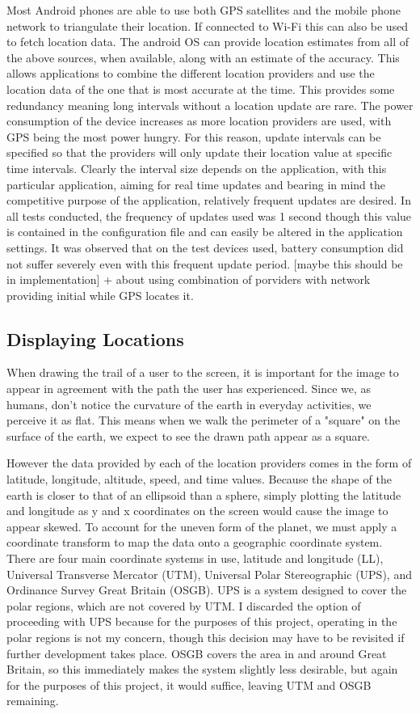 Most Android phones are able to use both GPS satellites and the mobile phone network to triangulate their location. If connected to Wi-Fi this can also be used to fetch location data.
The android OS can provide location estimates from all of the above sources, when available, along with an estimate of the accuracy. This allows applications to combine the different location providers and use the location data of the one that is most accurate at the time. This provides some redundancy meaning long intervals without a location update are rare. The power consumption of the device increases as more location providers are used, with GPS being the most power hungry. For this reason, update intervals can be specified so that the providers will only update their location value at specific time intervals. Clearly the interval size depends on the application, with this particular application, aiming for real time updates and bearing in mind the competitive purpose of the application, relatively frequent updates are desired.
In all tests conducted, the frequency of updates used was 1 second though this value is contained in the configuration file and can easily be altered in the application settings. It was observed that on the test devices used, battery consumption did not suffer severely even with this frequent update period. [maybe this should be in implementation] + about using combination of porviders with network providing initial while GPS locates it.

\subsection{Displaying Locations}
When drawing the trail of a user to the screen, it is important for the image to appear in agreement with the path the user has experienced. Since we, as humans, don't notice the curvature of the earth in everyday activities, we perceive it as flat. This means when we walk the perimeter of a "square" on the surface of the earth, we expect to see the drawn path appear as a square.

However the data provided by each of the location providers comes in the form of latitude, longitude, altitude, speed, and time values. Because the shape of the earth is closer to that of an ellipsoid than a sphere, simply plotting the latitude and longitude as y and x coordinates on the screen would cause the image to appear skewed. To account for the uneven form of the planet, we must apply a coordinate transform to map the data onto a geographic coordinate system. There are four main coordinate systems in use, latitude and longitude (LL), Universal Transverse Mercator (UTM), Universal Polar Stereographic (UPS), and Ordinance Survey Great Britain (OSGB). UPS is a system designed to cover the polar regions, which are not covered by UTM. I discarded the option of proceeding with UPS because for the purposes of this project, operating in the polar regions is not my concern, though this decision may have to be revisited if further development takes place. OSGB covers the area in and around Great Britain, so this immediately makes the system slightly less desirable, but again for the purposes of this project, it would suffice, leaving UTM and OSGB remaining.

